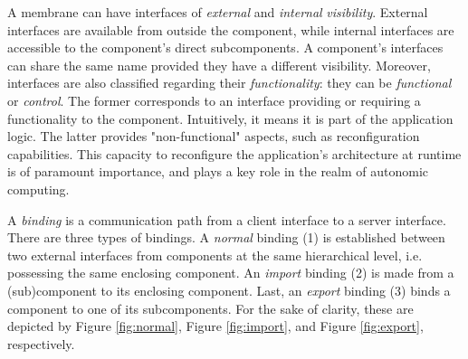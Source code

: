 		A membrane can have interfaces of \textit{external} and \textit{internal} \textit{visibility}. 
	External interfaces are available from outside the component, while internal interfaces
	are accessible to the component's direct subcomponents. A component's interfaces
	can share the same name provided they have a different visibility.	 Moreover,
	interfaces are also classified regarding their \textit{functionality}: they can be
	\textit{functional} or \textit{control}. The former corresponds to an interface
	providing or requiring a functionality to the component. Intuitively, it means it
	is part of the application logic. The latter provides "non-functional" aspects, 
	such as reconfiguration capabilities. This capacity to reconfigure the application's
	architecture at runtime is of paramount importance, and plays a key role in the
	realm of autonomic computing.
	
		A \textit{binding} is a communication path from a client interface to a server interface. There
	are three types of bindings. A \textit{normal} binding (1) is established between
	two external interfaces from components at the same hierarchical level, i.e.	
	possessing the same enclosing component. An \textit{import} binding	(2)	
	is made from a (sub)component to its enclosing component. Last, an \textit{export} binding (3)
	binds a component to one of its subcomponents. For the sake of clarity, these 
	are depicted by Figure \ref{fig:normal}, Figure \ref{fig:import}, and Figure \ref{fig:export}, respectively.			
			
